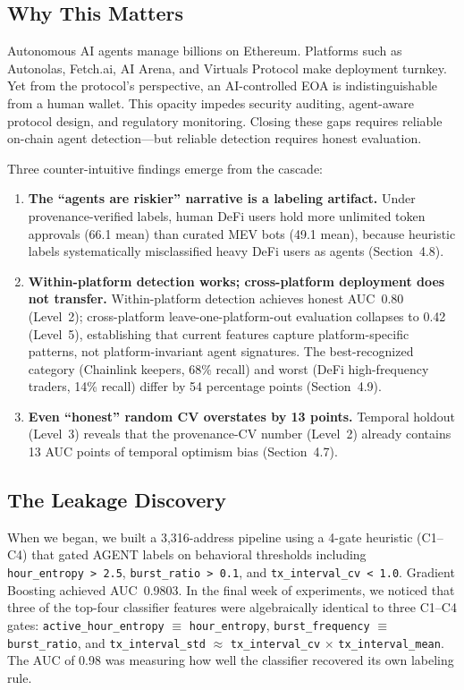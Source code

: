 \documentclass[sigconf,nonacm=false]{acmart}
\begin{document}
\subsection{Why This Matters}

Autonomous AI agents manage billions on Ethereum. Platforms such as Autonolas, Fetch.ai, AI Arena, and Virtuals Protocol make deployment turnkey. Yet from the protocol's perspective, an AI-controlled EOA is indistinguishable from a human wallet. This opacity impedes security auditing, agent-aware protocol design, and regulatory monitoring. Closing these gaps requires reliable on-chain agent detection---but reliable detection requires honest evaluation.

Three counter-intuitive findings emerge from the cascade:

\begin{enumerate}
    \item \textbf{The ``agents are riskier'' narrative is a labeling artifact.} Under provenance-verified labels, human DeFi users hold more unlimited token approvals (66.1 mean) than curated MEV bots (49.1 mean), because heuristic labels systematically misclassified heavy DeFi users as agents (Section~4.8).
    \item \textbf{Within-platform detection works; cross-platform deployment does not transfer.} Within-platform detection achieves honest AUC~0.80 (Level~2); cross-platform leave-one-platform-out evaluation collapses to 0.42 (Level~5), establishing that current features capture platform-specific patterns, not platform-invariant agent signatures. The best-recognized category (Chainlink keepers, 68\% recall) and worst (DeFi high-frequency traders, 14\% recall) differ by 54 percentage points (Section~4.9).
    \item \textbf{Even ``honest'' random CV overstates by 13 points.} Temporal holdout (Level~3) reveals that the provenance-CV number (Level~2) already contains 13 AUC points of temporal optimism bias (Section~4.7).
\end{enumerate}



\subsection{The Leakage Discovery}

When we began, we built a 3{,}316-address pipeline using a 4-gate heuristic (C1--C4) that gated AGENT labels on behavioral thresholds including \texttt{hour\_entropy~>~2.5}, \texttt{burst\_ratio~>~0.1}, and \texttt{tx\_interval\_cv~<~1.0}. Gradient Boosting achieved AUC~0.9803. In the final week of experiments, we noticed that three of the top-four classifier features were algebraically identical to three C1--C4 gates: \texttt{active\_hour\_entropy} $\equiv$ \texttt{hour\_entropy}, \texttt{burst\_frequency} $\equiv$ \texttt{burst\_ratio}, and \texttt{tx\_interval\_std} $\approx$ \texttt{tx\_interval\_cv} $\times$ \texttt{tx\_interval\_mean}. The AUC of 0.98 was measuring how well the classifier recovered its own labeling rule.
\end{document}
